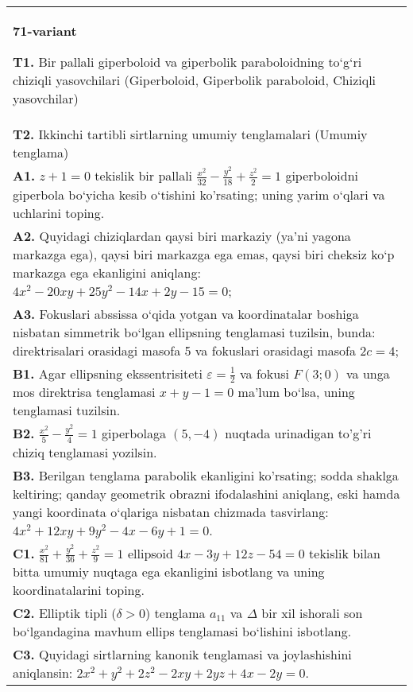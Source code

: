\documentclass{article}
\begin{document}
\begin{tabular}{m{17cm}}
\textbf{71-variant}
\newline

\textbf{T1.} Bir pallali giperboloid va giperbolik paraboloidning to‘g‘ri chiziqli yasovchilari (Giperboloid, Giperbolik paraboloid, Chiziqli yasovchilar) \\
\textbf{T2.} Ikkinchi tartibli sirtlarning umumiy tenglamalari (Umumiy tenglama) \\
\textbf{A1.} $z+1=0$ tekislik bir pallali $\frac{x^2}{32}-\frac{y^2}{18}+\frac{z^2}{2}=1$ giperboloidni giperbola bo‘yicha kesib o‘tishini ko'rsating; uning yarim o‘qlari va uchlarini toping. \\
\textbf{A2.} Quyidagi chiziqlardan qaysi biri markaziy (ya’ni yagona markazga ega), qaysi biri markazga ega emas, qaysi biri cheksiz ko‘p markazga ega ekanligini aniqlang: $4 x^2-20 x y+25 y^2-14 x+2 y-15=0$; \\
\textbf{A3.} Fokuslari abssissa o‘qida yotgan va koordinatalar boshiga nisbatan simmetrik bo‘lgan ellipsning tenglamasi tuzilsin, bunda: direktrisalari orasidagi masofa 5 va fokuslari orasidagi masofa $2 c=4$; \\
\textbf{B1.} Agar ellipsning ekssentrisiteti $\varepsilon=\frac{1}{2}$ va fokusi $F(3 ; 0)$ va unga mos direktrisa tenglamasi $x+y-1=0$ ma’lum bo‘lsa, uning tenglamasi tuzilsin. \\
\textbf{B2.} $\frac{x^2}{5}-\frac{y^2}{4}=1$ giperbolaga $(5,-4)$ nuqtada urinadigan to'g'ri chiziq tenglamasi yozilsin. \\
\textbf{B3.} Berilgan tenglama parabolik ekanligini ko'rsating; sodda shaklga keltiring; qanday geometrik obrazni ifodalashini aniqlang, eski hamda yangi koordinata o‘qlariga nisbatan chizmada tasvirlang: $4 x^2+12 x y+9 y^2-4 x-6 y+1=0$. \\
\textbf{C1.} $\frac{x^2}{81}+\frac{y^2}{36}+\frac{z^2}{9}=1$ ellipsoid $4 x-3 y+12 z-54=0$ tekislik bilan bitta umumiy nuqtaga ega ekanligini isbotlang va uning koordinatalarini toping. \\
\textbf{C2.} Elliptik tipli ($\delta>0$) tenglama $a_{11}$ va $\Delta$ bir xil ishorali son bo‘lgandagina mavhum ellips tenglamasi bo‘lishini isbotlang. \\
\textbf{C3.} Quyidagi sirtlarning kanonik tenglamasi va joylashishini aniqlansin: $2 x^2+y^2+2 z^2-2 x y+2 y z+4 x-2 y=0$. \\

\end{tabular}
\vspace{1cm}
\end{document}
